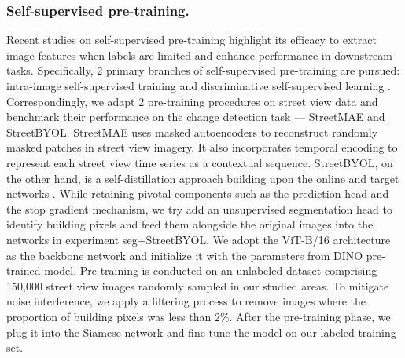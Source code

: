 \documentclass[letterpaper]{article} %
\begin{document}

\subsubsection{Self-supervised pre-training.}
Recent studies on self-supervised pre-training highlight its efficacy to extract image features when labels are limited and enhance performance in downstream tasks. Specifically, 2 primary branches of self-supervised pre-training are pursued: intra-image self-supervised training \cite{He2022masked,satmae2022} and discriminative self-supervised learning \cite{grill2020bootstrap}. Correspondingly, we adapt 2 pre-training procedures on street view data and benchmark their performance on the change detection task --- StreetMAE and StreetBYOL. StreetMAE uses masked autoencoders \cite{He2022masked} to reconstruct randomly masked patches in street view imagery. It also incorporates temporal encoding to represent each street view time series as a contextual sequence. StreetBYOL, on the other hand, is a self-distillation approach building upon the online and target networks \cite{grill2020bootstrap}. While retaining pivotal components such as the prediction head and the stop gradient mechanism, we try add an unsupervised segmentation head \cite{hamilton2021unsupervised} to identify building pixels and feed them alongside the original images into the networks in experiment seg+StreetBYOL. We adopt the ViT-B/16 architecture as the backbone network and initialize it with the parameters from DINO pre-trained model. Pre-training is conducted on an unlabeled dataset comprising 150,000 street view images randomly sampled in our studied areas. To mitigate noise interference, we apply a filtering process to remove images where the proportion of building pixels was less than $2\%$. After the pre-training phase, we plug it into the Siamese network and fine-tune the model on our labeled training set.
\end{document}
